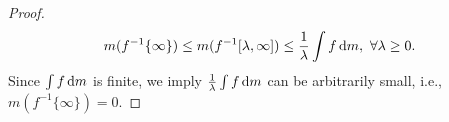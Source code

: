 \begin{proof}
\begin{align*}
m(f^{-1}\{\infty\})\le m(f^{-1}[\lambda,\infty])\le\frac{1}{\lambda}\int f\,\mathrm{d} m,\ \forall \lambda\ge0.
\end{align*}
Since $\int f\,\mathrm{d} m$ is finite, we imply $\frac{1}{\lambda}\int f\,\mathrm{d} m$ can be arbitrarily small, i.e., $m(f^{-1}\{\infty\})=0$.
\end{proof}















